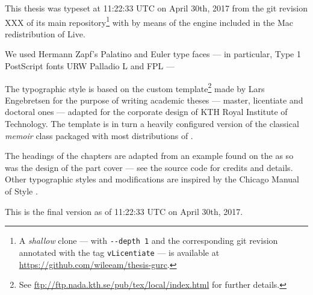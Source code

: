 
This thesis was typeset at 11:22:33 UTC on April 30th, 2017 from the git revision 
XXX of its main repository\footnote{A \emph{shallow} clone --- with \texttt{-{}-depth 
1} and the corresponding git revision annotated with the tag \texttt{vLicentiate} 
--- is available at \url{https://github.com/wileeam/thesis-gurc}.}
with  by means of the  engine  included 
in the Mac redistribution of  Live.

We used Hermann Zapf’s Palatino and Euler type faces --- in particular, Type 1 PostScript fonts URW 
Palladio L and FPL ---

The typographic style is based on the custom template\footnote{See \url{ftp://ftp.nada.kth.se/pub/tex/local/index.html} 
for further details.} made by Lars Engebretsen for the purpose of writing academic 
theses --- master, licentiate and doctoral ones --- adapted for the corporate design 
of KTH Royal Institute of Technology. The template is in turn a heavily configured 
version of the classical \emph{memoir} class packaged with most distributions of 
. 

The headings of the chapters are adapted from an example found on the \Internet 
as so was the design of the part cover --- see the source code for credits and details. 
Other typographic styles and modifications are inspired by the Chicago Manual of 
Style \cite{Chicago10}.

%
%

This is the final version as of 11:22:33 UTC on April 30th, 2017.